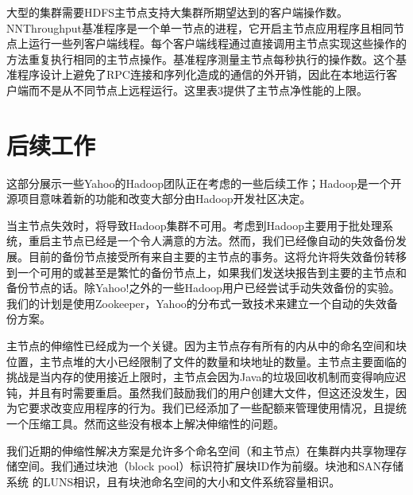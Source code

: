 大型的集群需要HDFS主节点支持大集群所期望达到的客户端操作数。NNThroughput基准程序是一个单一节点的进程，它开启主节点应用程序且相同节点上运行一些列客户端线程。每个客户端线程通过直接调用主节点实现这些操作的方法重复执行相同的主节点操作。基准程序测量主节点每秒执行的操作数。这个基准程序设计上避免了RPC连接和序列化造成的通信的外开销，因此在本地运行客户端而不是从不同节点上远程运行。这里表3提供了主节点净性能的上限。


\section{后续工作}

这部分展示一些Yahoo的Hadoop团队正在考虑的一些后续工作；Hadoop是一个开源项目意味着新的功能和改变大部分由Hadoop开发社区决定。

当主节点失效时，将导致Hadoop集群不可用。考虑到Hadoop主要用于批处理系统，重启主节点已经是一个令人满意的方法。然而，我们已经像自动的失效备份发展。目前的备份节点接受所有来自主要的主节点的事务。这将允许将失效备份转移到一个可用的或甚至是繁忙的备份节点上，如果我们发送块报告到主要的主节点和备份节点的话。除Yahoo!之外的一些Hadoop用户已经尝试手动失效备份的实验。我们的计划是使用Zookeeper，Yahoo的分布式一致技术来建立一个自动的失效备份方案。

主节点的伸缩性已经成为一个关键。因为主节点存有所有的内从中的命名空间和块位置，主节点堆的大小已经限制了文件的数量和块地址的数量。主节点主要面临的挑战是当内存的使用接近上限时，主节点会因为Java的垃圾回收机制而变得响应迟钝，并且有时需要重启。虽然我们鼓励我们的用户创建大文件，但这还没发生，因为它要求改变应用程序的行为。我们已经添加了一些配额来管理使用情况，且提统一个压缩工具。然而这些没有根本上解决伸缩性的问题。

我们近期的伸缩性解决方案是允许多个命名空间（和主节点）在集群内共享物理存储空间。我们通过块池（block pool）标识符扩展块ID作为前缀。块池和SAN存储系统 的LUNS相识，且有块池命名空间的大小和文件系统容量相识。

